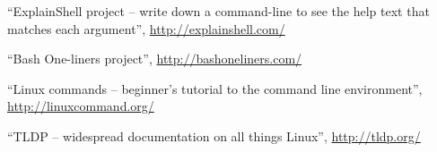 \documentclass[11pt]{article}
\begin{document}
\begin{thebibliography}{9}

  ``ExplainShell project -- write down a command-line to see the help text that 
  matches each argument'',
  \url{http://explainshell.com/}

  ``Bash One-liners project'',
  \url{http://bashoneliners.com/}

  ``Linux commands -- beginner's tutorial to the command line environment'',
  \url{http://linuxcommand.org/}

  ``TLDP -- widespread documentation on all things Linux'',
  \url{http://tldp.org/}

\end{thebibliography}
\end{document}
